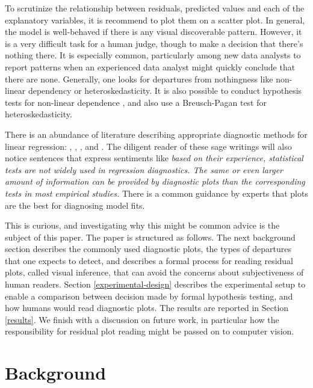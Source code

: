 \documentclass[]{interact}
\theoremstyle{plain}%
\theoremstyle{definition}
\theoremstyle{remark}
\begin{document}
To scrutinize the relationship between residuals, predicted values and
each of the explanatory variables, it is recommend to plot them on a
scatter plot. In general, the model is well-behaved if there is any
visual discoverable pattern. However, it is a very difficult task for a
human judge, though to make a decision that there's nothing there. It is
especially common, particularly among new data analysts to report
patterns when an experienced data analyst might quickly conclude that
there are none. Generally, one looks for departures from nothingness
like non-linear dependency or heteroskedasticity. It is also possible to
conduct hypothesis tests for non-linear dependence
\citep{ramsey_tests_1969}, and also use a Breusch-Pagan test
\citep{breusch_simple_1979} for heteroskedasticity.

There is an abundance of literature describing appropriate diagnostic
methods for linear regression: \citet{draper1998applied},
\citet{montgomery1982introduction}, \citet{belsley_regression_1980},
\citet{cook_applied_1999} and \citet{cook1982residuals}. The diligent
reader of these sage writings will also notice sentences that express
sentiments like \emph{based on their experience, statistical tests are
not widely used in regression diagnostics. The same or even larger
amount of information can be provided by diagnostic plots than the
corresponding tests in most empirical studies.} There is a common
guidance by experts that plots are the best for diagnosing model fits.

This is curious, and investigating why this might be common advice is
the subject of this paper. The paper is structured as follows. The next
background section describes the commonly used diagnostic plots, the
types of departures that one expects to detect, and describes a formal
process for reading residual plots, called visual inference, that can
avoid the concerns about subjectiveness of human readers. Section
\ref{experimental-design} describes the experimental setup to enable a
comparison between decision made by formal hypothesis testing, and how
humans would read diagnostic plots. The results are reported in Section
\ref{results}. We finish with a discussion on future work, in particular
how the responsibility for residual plot reading might be passed on to
computer vision.

\hypertarget{background}{%
\section{Background}\label{background}}
\end{document}
